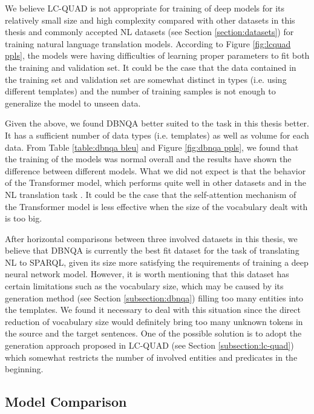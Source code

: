 We believe LC-QUAD is not appropriate for training of deep models for its relatively small size and high complexity compared with other datasets in this thesis and commonly accepted NL datasets (see Section \ref{section:datasets}) for training natural language translation models. According to Figure \ref{fig:lcquad ppls}, the models were having difficulties of learning proper parameters to fit both the training and validation set. It could be the case that the data contained in the training set and validation set are somewhat distinct in types (i.e. using different templates) and the number of training samples is not enough to generalize the model to unseen data. 

Given the above, we found DBNQA better suited to the task in this thesis better. It has a sufficient number of data types (i.e. templates) as well as volume for each data. From Table \ref{table:dbnqa bleu} and Figure \ref{fig:dbnqa ppls}, we found that the training of the models was normal overall and the results have shown the difference between different models. What we did not expect is that the behavior of the Transformer model, which performs quite well in other datasets and in the NL translation task \cite{Vaswani2017}. It could be the case that the self-attention mechanism of the Transformer model is less effective when the size of the vocabulary dealt with is too big.

After horizontal comparisons between three involved datasets in this thesis, we believe that DBNQA is currently the best fit dataset for the task of translating NL to SPARQL, given its size more satisfying the requirements of training a deep neural network model. However, it is worth mentioning that this dataset has certain limitations such as the vocabulary size, which may be caused by its generation method (see Section \ref{subsection:dbnqa}) filling too many entities into the templates. We found it necessary to deal with this situation since the direct reduction of vocabulary size would definitely bring too many unknown tokens in the source and the target sentences. One of the possible solution is to adopt the generation approach proposed in LC-QUAD (see Section \ref{subsection:lc-quad}) which somewhat restricts the number of involved entities and predicates in the beginning.

\subsection{Model Comparison}

